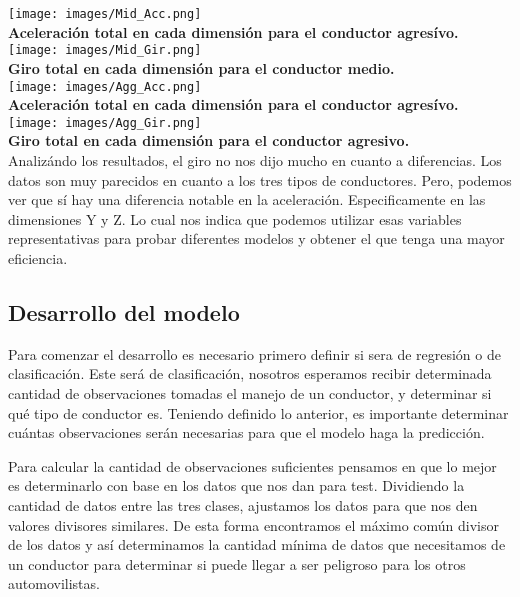 \documentclass{article}
\begin{document}
        \texttt{[image: images/Mid\_Acc.png]} \\

        \textbf{Aceleración total en cada dimensión para el conductor agresívo.} \\

        \texttt{[image: images/Mid\_Gir.png]} \\

        \textbf{Giro total en cada dimensión para el conductor medio.} \\

        \texttt{[image: images/Agg\_Acc.png]} \\

        \textbf{Aceleración total en cada dimensión para el conductor agresívo.} \\

        \texttt{[image: images/Agg\_Gir.png]} \\

        \textbf{Giro total en cada dimensión para el conductor agresivo.} \\

        Analizándo los resultados, el giro no nos dijo mucho en cuanto a diferencias. Los datos son muy parecidos en cuanto a los tres tipos de conductores. Pero, podemos ver que sí hay una diferencia notable en la aceleración. Especificamente en las dimensiones Y y Z. Lo cual nos indica que podemos utilizar esas variables representativas para probar diferentes modelos y obtener el que tenga una mayor eficiencia.
        

    \subsection{Desarrollo del modelo}

        Para comenzar el desarrollo es necesario primero definir si sera de regresión o de clasificación. Este será de clasificación, nosotros esperamos recibir determinada cantidad de observaciones tomadas el manejo de un conductor, y determinar si qué tipo de conductor es. Teniendo definido lo anterior, es importante determinar cuántas observaciones serán necesarias para que el modelo haga la predicción. 
        
        Para calcular la cantidad de observaciones suficientes pensamos en que lo mejor es determinarlo con base en los datos que nos dan para test. Dividiendo la cantidad de datos entre las tres clases, ajustamos los datos para que nos den valores divisores similares. De esta forma encontramos el máximo común divisor de los datos y así determinamos la cantidad mínima de datos que necesitamos de un conductor para determinar si puede llegar a ser peligroso para los otros automovilistas.
\end{document}
